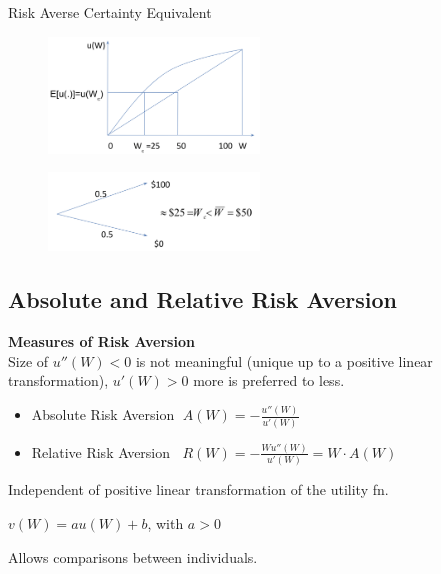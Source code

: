 \documentclass[
14pt,notheorems,hyperref={pdfauthor=whatever}
]{beamer}
\begin{document}
\begin{frame}
Risk Averse Certainty Equivalent\\
\begin{figure}[l1-ce]
    \includegraphics[width=0.5\textwidth]{L1-certaintyequiv}
    \centering
\end{figure}
\begin{figure}[l1-ce2]
    \includegraphics[width=0.5\textwidth]{L1-certaintyequiv2}
    \centering
\end{figure}
\end{frame}

\subsection{Absolute and Relative Risk Aversion}

\begin{frame}
\textbf{Measures of Risk Aversion}\\
\hfill \break
Size of  $u''(W)<0$  is not meaningful (unique up to a positive linear transformation),  $u'(W)>0$ more is preferred to less.\\
\begin{itemize}
    \item Absolute Risk Aversion $\;A(W) = -\frac{u''(W)}{u'(W)}$\\
    \item Relative Risk Aversion $\;\;R(W) = -\frac{Wu''(W)}{u'(W)} = W\cdot A(W)$\\
\end{itemize}
\hfill \break
Independent of positive linear transformation of the utility fn.
\begin{center}
    $v(W)=au(W)+b$, with $a>0$\\
\end{center}
Allows comparisons between individuals.\\
\end{frame}
\end{document}
